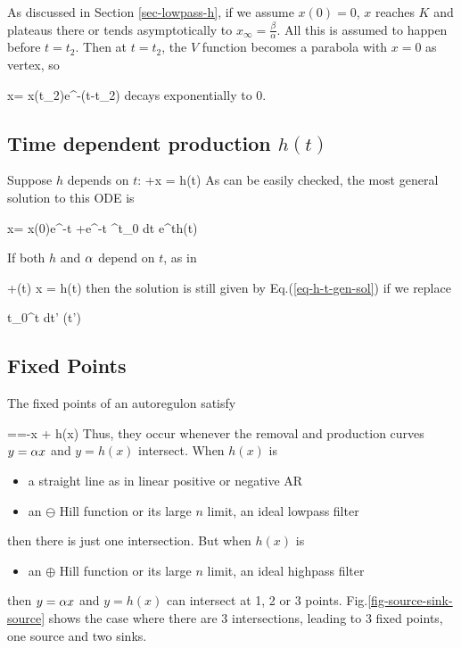 As discussed in Section \ref{sec-lowpass-h},
if we assume $x(0)=0$,
$x$ reaches $K$ and plateaus there or tends asymptotically
to $x_\infty =\frac{\beta}{\alpha}$.
All this is assumed to happen before $t=t_2$.
Then at $t=t_2$,
the $V$ function becomes a
parabola with $x=0$
as vertex,
so 

\beq
x= x(t_2)e^{-\alp (t-t_2)}
\eeq
 decays exponentially to 0.
 
\subsection{Time dependent production $h(t)$}

Suppose $h$ depends on $t$:
\beq
{} +\alp x = h(t)
\eeq
As can be easily checked,
the most general solution to this ODE is


\beq
x=
x(0)e^{-\alp t}
+e^{-\alp t}
\int^t_0 dt\;
e^{\alp t}h(t)
\label{eq-h-t-gen-sol}
\eeq

If both $h$ and $\alpha$ depend on $t$,
as in

\beq
{} +\alp(t) x = h(t)
\eeq
then the solution is still 
given by Eq.(\ref{eq-h-t-gen-sol})
if we replace
 

\beq
\alp t\rarrow \int_0^t dt'\; \alp(t')
\eeq



\subsection{Fixed Points}

The fixed points of an autoregulon satisfy

==-\alp x + h(x)
\eeq
Thus, they occur whenever the removal and production curves
$y=\alpha x$ and $y=h(x)$ intersect. When $h(x)$ is 

\begin{itemize}
\item
a straight line as in 
linear positive or negative
AR
\item an $\ominus$ Hill function or 
its large $n $ limit, an ideal lowpass filter
\end{itemize}
then
there is just one intersection. But when
$h(x)$ is 

\begin{itemize}
\item an $\oplus$ Hill function or 
its large $n $ limit, an ideal highpass filter
\end{itemize}
then
$y=\alpha x$ and $y=h(x)$ can intersect at 1, 2 or 3 points.
Fig.\ref{fig-source-sink-source} shows 
the case where there are 3 intersections, leading to 3 fixed points,
one source and two sinks.

